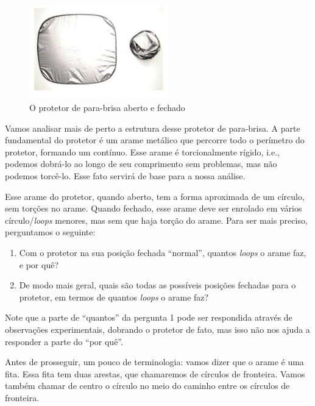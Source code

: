	\begin{figure}[H]
		\begin{center}
			\includegraphics[width=6cm]{Images/protetor_solar.png}
		\end{center}\caption{O protetor de para-brisa aberto e fechado}\label{protetor solar}
	\end{figure}
	\par\vspace{0.3cm} Vamos analisar mais de perto a estrutura desse protetor de para-brisa. A parte fundamental do protetor é um arame metálico que percorre todo o perímetro do protetor, formando um  contínuo. Esse arame é torcionalmente rígido, i.e., podemos dobrá-lo ao longo de seu comprimento sem problemas, mas não podemos torcê-lo. Esse fato servirá de base para a nossa análise.
	\par\vspace{0.3cm} Esse arame do protetor, quando aberto, tem a forma aproximada de um círculo, sem torções no arame. Quando fechado, esse arame deve ser enrolado em vários círculo/\textit{loops} menores, mas sem que haja torção do arame. Para ser mais preciso, perguntamos o seguinte:
	\begin{enumerate}
		\item Com o protetor na sua posição fechada ``normal'', quantos \textit{loops} o arame faz, e por quê?
		\item De modo mais geral, quais são todas as possíveis posições fechadas para o protetor, em termos de quantos \textit{loops} o arame faz? 
	\end{enumerate} 
	\par\vspace{0.3cm} Note que a parte de ``quantos'' da pergunta 1 pode ser respondida através de observações experimentais, dobrando o protetor de fato, mas isso não nos ajuda a responder a parte do ``por quê''.
	\par\vspace{0.3cm} Antes de prosseguir, um pouco de terminologia: vamos dizer que o arame é uma fita. Essa fita tem duas arestas, que chamaremos de círculos de fronteira. Vamos também chamar de centro o círculo no meio do caminho entre os círculos de fronteira. 
